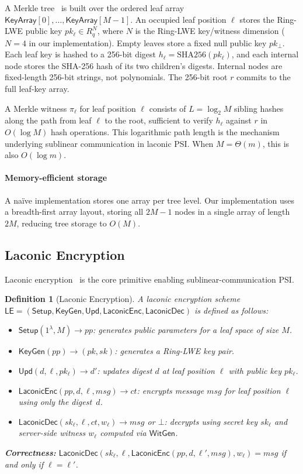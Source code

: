 \documentclass[preprint,12pt]{elsarticle}
\newtheorem{definition}{Definition}
\newcommand{\laconicenc}{\textsf{LaconicEnc}}
\newcommand{\laconicdec}{\textsf{LaconicDec}}
\newcommand{\keygen}{\textsf{KeyGen}}
\newcommand{\upd}{\textsf{Upd}}
\newcommand{\witgen}{\textsf{WitGen}}
\newcommand{\KeyArray}{\mathsf{KeyArray}}
\newcommand{\NullPK}{pk_{\bot}}
\begin{document}
A Merkle tree~\cite{merkle1988digital} is built over the ordered leaf array
$\KeyArray[0],\ldots,\KeyArray[M-1]$. An occupied leaf position $\ell$ stores
the Ring-LWE public key $pk_\ell \in R_q^N$, where $N$ is the Ring-LWE
key/witness dimension ($N=4$ in our implementation). Empty leaves store a
fixed null public key $\NullPK$. Each leaf key is hashed to a 256-bit digest
$h_\ell = \text{SHA256}(pk_\ell)$, and each internal node stores the SHA-256
hash of its two children's digests. Internal nodes are fixed-length 256-bit
strings, not polynomials. The 256-bit root $r$ commits to the full leaf-key
array.

A Merkle witness $\pi_\ell$ for leaf position $\ell$ consists of $L=\log_2 M$
sibling hashes along the path from leaf $\ell$ to the root, sufficient to
verify $h_\ell$ against $r$ in $O(\log M)$ hash operations. This logarithmic
path length is the mechanism underlying sublinear communication in laconic PSI.
When $M=\Theta(m)$, this is also $O(\log m)$.

\paragraph{Memory-efficient storage}
A na\"{i}ve implementation stores one array per tree level. Our implementation
uses a breadth-first array layout, storing all $2M-1$ nodes in a single array
of length $2M$, reducing tree storage to $O(M)$.


\subsection{Laconic Encryption}
\label{subsec:laconic_enc}

Laconic encryption~\cite{dottling2023laconic} is the core primitive enabling
sublinear-communication PSI.

\begin{definition}[Laconic Encryption]
A laconic encryption scheme
$\mathsf{LE} = (\mathsf{Setup}, \mathsf{KeyGen}, \mathsf{Upd},
\laconicenc, \laconicdec)$ is defined as follows:
\begin{itemize}[leftmargin=*]
  \item $\mathsf{Setup}(1^\lambda, M) \to \mathit{pp}$: generates public
        parameters for a leaf space of size $M$.
  \item $\keygen(\mathit{pp}) \to (pk, sk)$: generates a Ring-LWE key pair.
  \item $\upd(d, \ell, pk_\ell) \to d'$: updates digest $d$ at leaf position
        $\ell$ with public key $pk_\ell$.
  \item $\laconicenc(\mathit{pp}, d, \ell, \mathit{msg}) \to \mathit{ct}$:
        encrypts message $\mathit{msg}$ for leaf position $\ell$ using only
        the digest~$d$.
  \item $\laconicdec(sk_\ell, \ell, \mathit{ct}, w_\ell) \to \mathit{msg}$
        or $\bot$: decrypts using secret key $sk_\ell$ and server-side
        witness $w_\ell$ computed via $\witgen$.
\end{itemize}
\textbf{Correctness:}
$\laconicdec(sk_\ell, \ell, \laconicenc(\mathit{pp}, d, \ell',
\mathit{msg}), w_\ell) = \mathit{msg}$ if and only if $\ell=\ell'$.
\end{definition}
\end{document}
